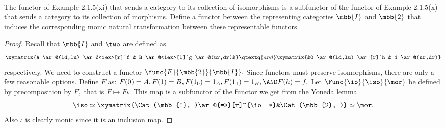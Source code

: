 \documentclass[../../main]{subfiles}
\begin{document}
\paragraph{}
\begin{exercise}
	The functor of Example 2.1.5(xi) that sends a category to its collection of
	isomorphisms is a subfunctor of the functor of Example 2.1.5(x) that sends
	a category to its collection of morphisms. Define a functor between the
	representing categories $ \mbb{I} $ and $ \mbb{2} $ that induces the
	corresponding monic natural transformation between these representable
	functors.
\end{exercise}

\begin{proof}
	Recall that $\mbb{I}$ and $\two$ are defined as
	\[\xymatrix{A \ar@(ld,lu) \ar@<1ex>[r]^f & B \ar@<1ex>[l]^g \ar@(ur,dr)&}
	\qtextq{and} \xymatrix{&0 \ar@(ld,lu) \ar[r]^h & 1 \ar@(ur,dr)}\]
	respectively.
	We need to construct a functor $ \func{F}{\mbb{2}}{\mbb{I}}.$
	Since functors must preserve isomorphisms, there are only a few reasonable
	options. Define $ F $ as: $ F(0)=A,F(1)=B, F(1_0)=1_A,F(1_1)=1_B,\AND F(h)=
	f.$ Let $\Func{\io}{\iso}{\mor}$ be defined by precomposition by $F,$ that is $
	F\mapsto F\iota. $ This map is a subfunctor of the functor we
	get from the Yoneda lemma
	$$
	\iso \simeq \xymatrix{\Cat(\mbb{I},-)\ar@{=>}[r]^{\io_*}&\Cat(\mbb{2},-)} \simeq \mor.
	$$
	Also $ \iota $ is clearly monic since it is an inclusion map.
\end{proof}
\end{document}
